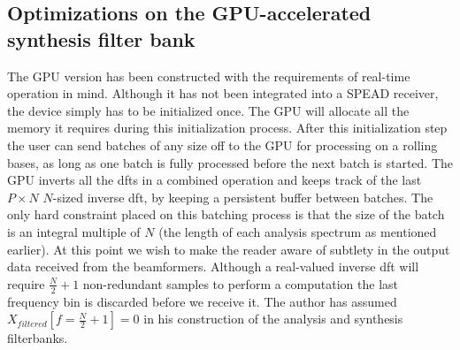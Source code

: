 \documentclass[a4paper,10pt]{article}
\begin{document}
\subsection{Optimizations on the GPU-accelerated synthesis filter bank}
The GPU version has been constructed with the requirements of real-time operation in mind. Although it has not been integrated into a SPEAD receiver, the device simply has
to be initialized once. The GPU will allocate all the memory it requires during this initialization process. After this initialization step the user can send batches of any size 
off to the GPU for processing on a rolling bases, as long as one batch is fully processed before the next batch is started. The GPU inverts all the \gls{dft}s in a combined operation  
and keeps track of the last $P\times N$ $N$-sized inverse \gls{dft}, by keeping a persistent buffer between batches. The only hard constraint placed on this batching process is that 
the size of the batch is an integral multiple of $N$ (the length of each analysis spectrum as mentioned earlier). At this point we wish to make the reader aware of subtlety in the 
output data received from the beamformers. Although a real-valued inverse \gls{dft} will require $\frac{N}{2}+1$ non-redundant samples to perform a computation the last frequency bin 
is discarded before we receive it. The author has assumed $X_{filtered}[f=\frac{N}{2}+1] = 0$ in his construction of the analysis and synthesis filterbanks.
\end{document}
